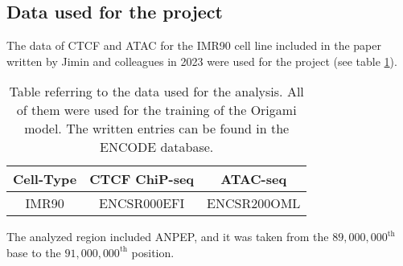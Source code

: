 \subsection{Data used for the project} \label{methods: data used}
The data of CTCF and ATAC for the IMR90 cell line included in the paper written by Jimin and colleagues in 2023
\cite{tanCelltypespecificPrediction3D2023}
were used for the project (see table \ref{tab:data}).

\begin{table}[H]
    \centering
    \begin{tabular}{|c|c|c|}
        \hline
        \textbf{Cell-Type} & \textbf{CTCF ChiP-seq} & \textbf{ATAC-seq}\\
        \hline
        IMR90 & ENCSR000EFI & ENCSR200OML\\
        \hline
    \end{tabular}
    \caption{Table referring to the data used for the analysis. All of them were used for the training of the Origami\cite{tanCelltypespecificPrediction3D2023} model. The written entries can be found in the ENCODE database\cite{encodeprojectconsortiumIntegratedEncyclopediaDNA2012}.}
    \label{tab:data}
\end{table}

The analyzed region included ANPEP, and it was taken from the $89,000,000^{\text{th}}$ base to the $91,000,000^{\text{th}}$ position. 